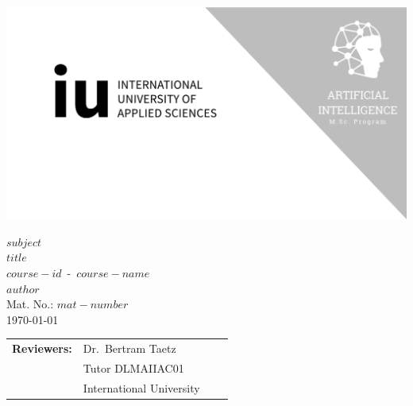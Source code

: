
\def\RNameA{Dr.\ Bertram Taetz}
\def\RFunctionA{Tutor DLMAIIAC01}
\def\RInstitutionA{International University}

\def\RNameB{}
\def\RFunctionB{}
\def\RInstitutionB{}

\def\RNameC{}
\def\RFunctionC{}
\def\RInstitutionC{}

\thispagestyle{empty}

\centerline{\includegraphics[width=\paperwidth]{template/img/cover-image.png}}

\vspace{8.5em}

{\Large $subject$}\\
{\Huge $title$}\\
{\LARGE $course-id$\ -\ $course-name$}\\
{\LARGE $author$}\\
{\Large Mat. No.: $mat-number$}\\
{\Large \germandatetime\today}

\vspace*{\fill}

\begin{tabular}{p{0.8in} p{1.5in} p{1.5in} p{1.5in}}
    \textbf{Reviewers:} & \RNameA{}        & \RNameB{}        & \RNameC{}        \\
                        & \RFunctionA{}    & \RFunctionB{}    & \RFunctionC{}    \\
                        & \RInstitutionA{} & \RInstitutionB{} & \RInstitutionC{}
\end{tabular}


\restoregeometry{}
\clearpage
